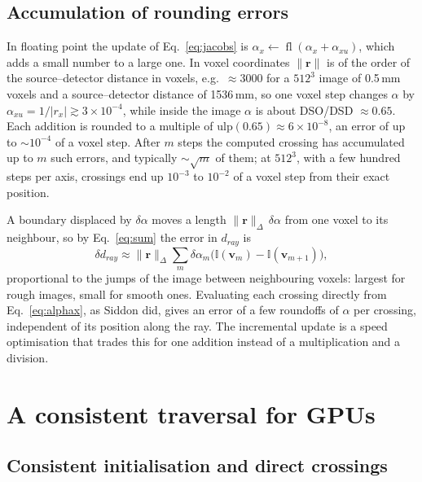 \documentclass[11pt,a4paper]{article}
\theoremstyle{remark}
\newcommand{\I}{\mathbb{I}}
\newcommand{\fl}{\operatorname{fl}}
\begin{document}
\subsection{Accumulation of rounding errors}
\label{sec:drift}

In floating point the update of Eq.~\eqref{eq:jacobs} is $\alpha_x\gets\fl(\alpha_x+\alpha_{xu})$, which
adds a small number to a large one. In voxel coordinates $\|\mathbf{r}\|$ is of the order of the
source--detector distance in voxels, e.g.\ $\approx3000$ for a $512^3$ image of 0.5\,mm voxels and a
source--detector distance of 1536\,mm, so one voxel step changes $\alpha$ by
$\alpha_{xu}=1/|r_x|\gtrsim3\times10^{-4}$, while inside the image $\alpha$ is about DSO/DSD $\approx0.65$.
Each addition is rounded to a multiple of $\mathrm{ulp}(0.65)\approx6\times10^{-8}$, an error of up to
$\sim10^{-4}$ of a voxel step. After $m$ steps the computed crossing has accumulated up to $m$ such errors,
and typically $\sim\sqrt m$ of them; at $512^3$, with a few hundred steps per axis, crossings end up
$10^{-3}$ to $10^{-2}$ of a voxel step from their exact position.

A boundary displaced by $\delta\alpha$ moves a length $\|\mathbf r\|_\Delta\,\delta\alpha$ from one voxel to
its neighbour, so by Eq.~\eqref{eq:sum} the error in $d_{ray}$ is
\begin{equation}
\delta d_{ray}\approx\|\mathbf r\|_\Delta\sum_m\delta\alpha_m\big(\I(\mathbf v_m)-\I(\mathbf v_{m+1})\big),
\end{equation}
proportional to the jumps of the image between neighbouring voxels: largest for rough images, small for
smooth ones. Evaluating each crossing directly from Eq.~\eqref{eq:alphax}, as Siddon did, gives an error
of a few roundoffs of $\alpha$ per crossing, independent of its position along the ray. The incremental
update is a speed optimisation that trades this for one addition instead of a multiplication and a
division.

\section{A consistent traversal for GPUs}
\label{sec:new}

\subsection{Consistent initialisation and direct crossings}
\end{document}
